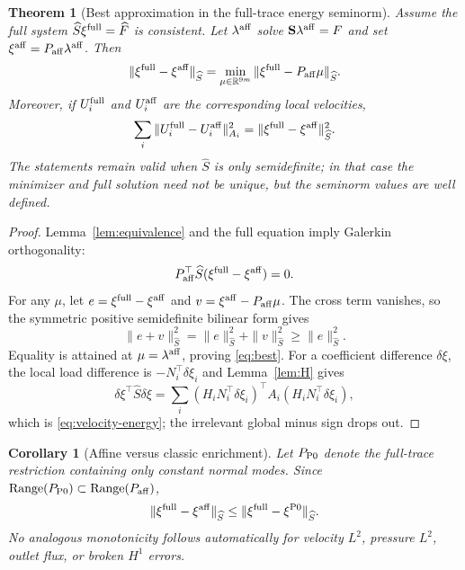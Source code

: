 \documentclass[11pt,a4paper]{article}
\newtheorem{theorem}[assumption]{Theorem}
\newtheorem{corollary}[assumption]{Corollary}
\newcommand{\R}{\mathbb{R}}
\newcommand{\Schur}{\mathbf S}
\newcommand{\Range}{\operatorname{Range}}
\begin{document}
\begin{theorem}[Best approximation in the full-trace energy seminorm]
\label{thm:galerkin}
Assume the full system
$\widehat S\xi^{\rm full}=\widehat F$ is consistent.  Let
$\lambda^{\rm aff}$ solve
$\Schur\lambda^{\rm aff}=F$ and set
$\xi^{\rm aff}=P_{\rm aff}\lambda^{\rm aff}$.  Then
\begin{equation}\label{eq:best}
 \|\xi^{\rm full}-\xi^{\rm aff}\|_{\widehat S}
 =\min_{\mu\in\R^{9m}}
 \|\xi^{\rm full}-P_{\rm aff}\mu\|_{\widehat S}.
\end{equation}
Moreover, if $U_i^{\rm full}$ and $U_i^{\rm aff}$ are the corresponding
local velocities,
\begin{equation}\label{eq:velocity-energy}
 \sum_i\|U_i^{\rm full}-U_i^{\rm aff}\|_{A_i}^2
 =\|\xi^{\rm full}-\xi^{\rm aff}\|_{\widehat S}^2.
\end{equation}
The statements remain valid when $\widehat S$ is only semidefinite; in that
case the minimizer and full solution need not be unique, but the seminorm
values are well defined.
\end{theorem}

\begin{proof}
Lemma~\ref{lem:equivalence} and the full equation imply Galerkin
orthogonality:
\[
 P_{\rm aff}^\top\widehat S
 (\xi^{\rm full}-\xi^{\rm aff})=0.
\]
For any $\mu$, let $e=\xi^{\rm full}-\xi^{\rm aff}$ and
$v=\xi^{\rm aff}-P_{\rm aff}\mu$.  The cross term vanishes, so the symmetric
positive semidefinite bilinear form gives
\[
 \|e+v\|_{\widehat S}^2
 =\|e\|_{\widehat S}^2+\|v\|_{\widehat S}^2
 \ge\|e\|_{\widehat S}^2.
\]
Equality is attained at $\mu=\lambda^{\rm aff}$, proving \eqref{eq:best}.
For a coefficient difference $\delta\xi$, the local load difference is
$-N_i^\top\delta\xi_i$ and Lemma~\ref{lem:H} gives
\[
 \delta\xi^\top\widehat S\delta\xi
 =\sum_i(H_iN_i^\top\delta\xi_i)^\top
 A_i(H_iN_i^\top\delta\xi_i),
\]
which is \eqref{eq:velocity-energy}; the irrelevant global minus sign drops
out.
\end{proof}

\begin{corollary}[Affine versus classic enrichment]\label{cor:enrich}
Let $P_{\rm P0}$ denote the full-trace restriction containing only constant
normal modes.  Since
$\Range(P_{\rm P0})\subset\Range(P_{\rm aff})$,
\begin{equation}\label{eq:enrich}
 \|\xi^{\rm full}-\xi^{\rm aff}\|_{\widehat S}
 \le
 \|\xi^{\rm full}-\xi^{\rm P0}\|_{\widehat S}.
\end{equation}
No analogous monotonicity follows automatically for velocity $L^2$, pressure
$L^2$, outlet flux, or broken $H^1$ errors.
\end{corollary}
\end{document}
